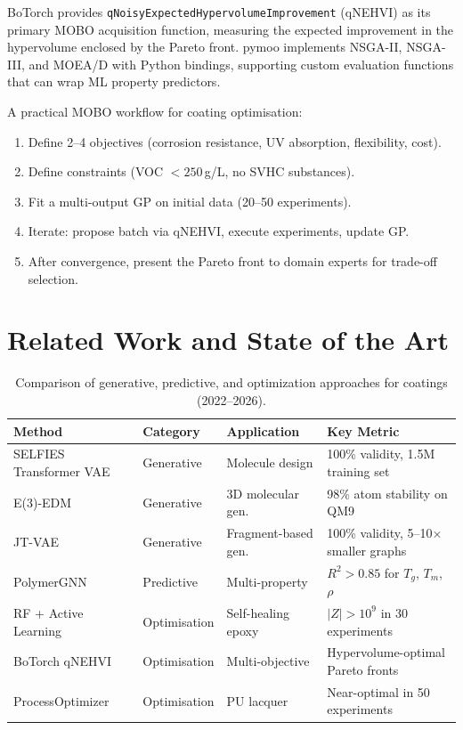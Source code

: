 \documentclass[11pt,a4paper]{article}
\begin{document}
BoTorch provides \texttt{qNoisyExpectedHypervolumeImprovement} (qNEHVI) as its primary MOBO acquisition function, measuring the expected improvement in the hypervolume enclosed by the Pareto front.
pymoo implements NSGA-II, NSGA-III, and MOEA/D with Python bindings, supporting custom evaluation functions that can wrap ML property predictors.

A practical MOBO workflow for coating optimisation:
\begin{enumerate}[nosep]
  \item Define 2--4 objectives (corrosion resistance, UV absorption, flexibility, cost).
  \item Define constraints (VOC $< 250$\,g/L, no SVHC substances).
  \item Fit a multi-output GP on initial data (20--50 experiments).
  \item Iterate: propose batch via qNEHVI, execute experiments, update GP.
  \item After convergence, present the Pareto front to domain experts for trade-off selection.
\end{enumerate}

\section{Related Work and State of the Art}
\label{sec:related}

\begin{table}[h]
\centering
\caption{Comparison of generative, predictive, and optimization approaches for coatings (2022--2026).}
\label{tab:comparison}
\small
\begin{tabular}{@{}p{3.2cm}p{2.5cm}p{3cm}p{4cm}@{}}
\toprule
\textbf{Method} & \textbf{Category} & \textbf{Application} & \textbf{Key Metric} \\
\midrule
SELFIES Transformer VAE & Generative & Molecule design & 100\% validity, 1.5M training set \\
E(3)-EDM & Generative & 3D molecular gen. & 98\% atom stability on QM9 \\
JT-VAE & Generative & Fragment-based gen. & 100\% validity, 5--10$\times$ smaller graphs \\
PolymerGNN & Predictive & Multi-property & $R^2 > 0.85$ for $T_g$, $T_m$, $\rho$ \\
RF + Active Learning & Optimisation & Self-healing epoxy & $|Z| > 10^9$ in 30 experiments \\
BoTorch qNEHVI & Optimisation & Multi-objective & Hypervolume-optimal Pareto fronts \\
ProcessOptimizer & Optimisation & PU lacquer & Near-optimal in 50 experiments \\
\bottomrule
\end{tabular}
\end{table}
\end{document}
